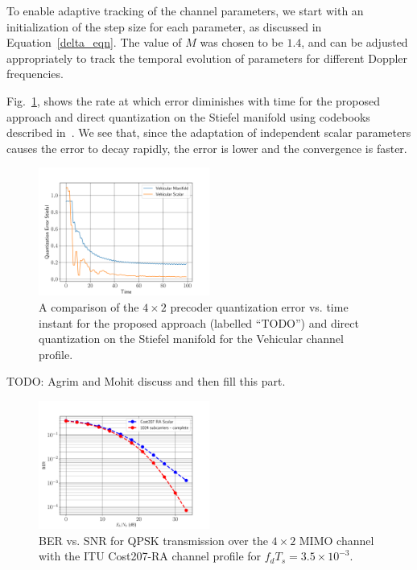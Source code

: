\documentclass[journal,10pt,twocolumn]{IEEEtran}
\begin{document}
To enable adaptive tracking of the channel parameters, we start with
an initialization of the step size for each parameter, as discussed in
Equation~\ref{delta_eqn}. The value of $M$ was chosen to be $1.4$, and
can be adjusted appropriately to track the temporal evolution of
parameters for different Doppler frequencies.

Fig.~\ref{fig:error_decay}, shows the rate at which error diminishes
with time for the proposed approach and direct quantization on the
Stiefel manifold using codebooks described
in~\cite{Gupt1905:Predictive}. We see that, since the adaptation of
independent scalar parameters causes the error to decay rapidly, the
error is lower and the convergence is faster.
\begin{figure}
\includegraphics[width=0.5\textwidth]{images/stief_veh.pdf}
\caption{\label{fig:error_decay}A comparison of the $4\times 2$ precoder quantization error vs. time instant for
  the proposed approach (labelled ``TODO'') and direct quantization on
the Stiefel manifold for the Vehicular channel profile.}
\end{figure}

TODO: Agrim and Mohit discuss and then fill this part.
\begin{figure}
\includegraphics[width=0.5\textwidth]{images/cost0035}
\caption{BER vs. SNR for QPSK transmission over the $4\times 2$ MIMO
  channel with the ITU Cost207-RA channel profile for $f_dT_s = 3.5\times 10^{-3}$.}
\label{fig:ber_ped}
\end{figure}
\end{document}

